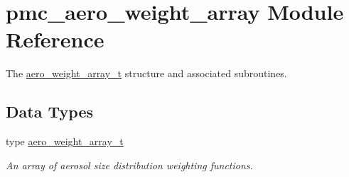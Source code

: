 \hypertarget{namespacepmc__aero__weight__array}{}\section{pmc\+\_\+aero\+\_\+weight\+\_\+array Module Reference}
\label{namespacepmc__aero__weight__array}


The \mbox{\hyperlink{structpmc__aero__weight__array_1_1aero__weight__array__t}{aero\+\_\+weight\+\_\+array\+\_\+t}} structure and associated subroutines.  


\subsection*{Data Types}
\begin{DoxyCompactItemize}
\item 
type \mbox{\hyperlink{structpmc__aero__weight__array_1_1aero__weight__array__t}{aero\+\_\+weight\+\_\+array\+\_\+t}}
\begin{DoxyCompactList}\small\item\em An array of aerosol size distribution weighting functions. \end{DoxyCompactList}\end{DoxyCompactItemize}
